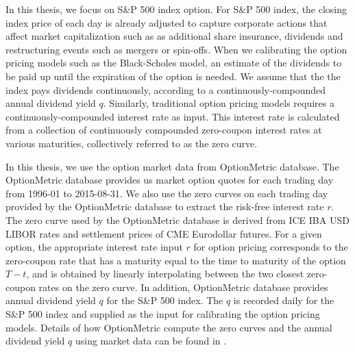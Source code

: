 \documentclass[letterpaper,12pt,titlepage,oneside,final]{book}
\numberwithin{equation}{section}
\theoremstyle{definition}
\begin{document}

In this thesis, we focus on S\&P 500 index option. For S\&P 500 index, the closing index price of each day is already adjusted to capture corporate actions that affect market capitalization such as as additional share insurance, dividends and restructuring events such as mergers or spin-offs\cite{lassance2018comparison}. When we calibrating the  option pricing models such as the Black-Scholes model,   an estimate of the dividends to be paid up until the  expiration of the option is needed.  We assume that the the index pays dividends continuously, according to a continuously-compounded annual dividend yield $q$. Similarly, traditional option pricing models requires a continuously-compounded interest rate as input. This interest rate is calculated from a collection of continuously compounded zero-coupon interest rates at various maturities, collectively referred to as the zero curve. 

In this thesis, we use the option market data from OptionMetric \cite{optionmetrics2008ivy} database. The OptionMetric \cite{optionmetrics2008ivy} database provides us market option quotes for each trading day from 1996-01 to 2015-08-31.  We also use the zero curves on each trading day provided by the OptionMetric \cite{optionmetrics2008ivy} database to extract the risk-free interest rate $r$. The zero curve used by the OptionMetric database is derived from ICE IBA USD LIBOR rates and settlement prices of CME Eurodollar futures. For a given option, the appropriate interest rate input $r$ for option pricing corresponds to the zero-coupon rate that has a maturity equal to the time to maturity of the option $T-t$, and is obtained by linearly interpolating between the two closest zero-coupon rates on the zero curve. In addition, OptionMetric \cite{optionmetrics2008ivy} database provides annual  dividend yield $q$ for the S\&P 500 index. The $q$ is recorded daily for the S\&P 500 index and supplied as the input for calibrating the option pricing models.  Details of how OptionMetric compute the zero curves and the annual dividend yield $q$  using market data can be found in \cite{optionmetrics2008ivy}.





\end{document}
